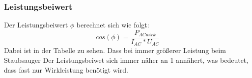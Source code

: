 \subsubsection{Leistungsbeiwert}
Der Leistungsbeiwert $ \phi $ berechnet sich wie folgt:
%
\begin{equation}
	cos(\phi)=\frac{ P_{ ACwirk } }{  I_{ AC }*U_{AC }}
\end{equation}
%
Dabei ist in der Tabelle zu sehen. Dass bei immer größerer Leistung beim Staubsauger Der Leistungsbeiwet sich immer näher an 1 annähert, was bedeutet, dass fast nur Wirkleistung benötigt wird.